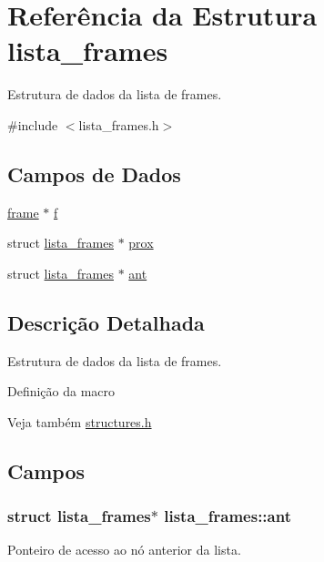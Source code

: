\hypertarget{structlista__frames}{}\section{Referência da Estrutura lista\+\_\+frames}
\label{structlista__frames}


Estrutura de dados da lista de frames.  




{\ttfamily \#include $<$lista\+\_\+frames.\+h$>$}

\subsection*{Campos de Dados}
\begin{DoxyCompactItemize}
\item 
\hyperlink{structframe}{frame} $\ast$ \hyperlink{structlista__frames_ad7777179f480ab04a686cf8edf19addf}{f}
\item 
struct \hyperlink{structlista__frames}{lista\+\_\+frames} $\ast$ \hyperlink{structlista__frames_ac33c75b9e66a517b493e6d35a3c1efb3}{prox}
\item 
struct \hyperlink{structlista__frames}{lista\+\_\+frames} $\ast$ \hyperlink{structlista__frames_ac0c434c06689eb8f4a43e9affaa70be5}{ant}
\end{DoxyCompactItemize}


\subsection{Descrição Detalhada}
Estrutura de dados da lista de frames. 

Definição da macro

\begin{DoxySeeAlso}{Veja também}
\hyperlink{structures_8h}{structures.\+h} 
\end{DoxySeeAlso}


\subsection{Campos}
\subsubsection[{\texorpdfstring{ant}{ant}}]{\setlength{\rightskip}{0pt plus 5cm}struct {\bf lista\+\_\+frames}$\ast$ lista\+\_\+frames\+::ant}\hypertarget{structlista__frames_ac0c434c06689eb8f4a43e9affaa70be5}{}\label{structlista__frames_ac0c434c06689eb8f4a43e9affaa70be5}
Ponteiro de acesso ao nó anterior da lista. 
